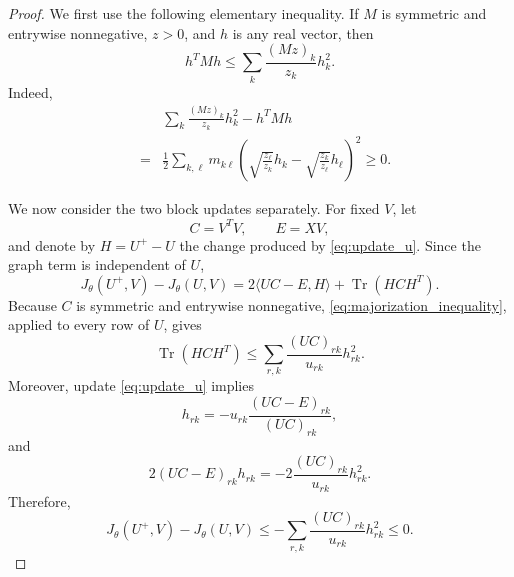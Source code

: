 \documentclass[11pt]{article}
\theoremstyle{remark}
\newcommand{\Tr}{\operatorname{Tr}}
\begin{document}
\begin{proof}
We first use the following elementary inequality. If $M$ is symmetric and entrywise nonnegative, $z>0$, and $h$ is any real vector, then
\begin{equation}
\label{eq:majorization_inequality}
h^{T}Mh\le\sum_k\frac{(Mz)_k}{z_k}h_k^2.
\end{equation}
Indeed,
\begin{eqnarray*}
&&\sum_k\frac{(Mz)_k}{z_k}h_k^2-h^{T}Mh\\
&=&\frac12\sum_{k,\ell}m_{k\ell}
\left(\sqrt{\frac{z_{\ell}}{z_k}}h_k-\sqrt{\frac{z_k}{z_{\ell}}}h_{\ell}\right)^2\ge0.
\end{eqnarray*}

We now consider the two block updates separately. For fixed $V$, let
\[
C=V^{T}V,\qquad E=XV,
\]
and denote by $H=U^{+}-U$ the change produced by \eqref{eq:update_u}. Since the graph term is independent of $U$,
\[
J_{\theta}(U^{+},V)-J_{\theta}(U,V)
=2\langle UC-E,H\rangle+\Tr(HCH^{T}).
\]
Because $C$ is symmetric and entrywise nonnegative, \eqref{eq:majorization_inequality}, applied to every row of $U$, gives
\[
\Tr(HCH^{T})\le\sum_{r,k}\frac{(UC)_{rk}}{u_{rk}}h_{rk}^2.
\]
Moreover, update \eqref{eq:update_u} implies
\[
h_{rk}=-u_{rk}\frac{(UC-E)_{rk}}{(UC)_{rk}},
\]
and
\[
2(UC-E)_{rk}h_{rk}=-2\frac{(UC)_{rk}}{u_{rk}}h_{rk}^2.
\]
Therefore,
\[
J_{\theta}(U^{+},V)-J_{\theta}(U,V)
\le-\sum_{r,k}\frac{(UC)_{rk}}{u_{rk}}h_{rk}^2\le0.
\]


\end{proof}
\end{document}
